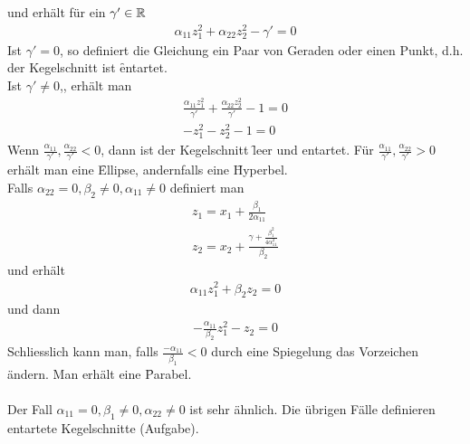 und erhält für ein $\gamma' \in \mathbb{R}$
\begin{align}
\alpha_{11} z_{1}^{2} + \alpha_{22} z_{2}^{2} - \gamma' = 0
\end{align}
Ist $\gamma' = 0$, so definiert die Gleichung ein Paar von Geraden oder einen Punkt, d.h. der Kegelschnitt ist \f{entartet}. \\
Ist $\gamma' \neq 0$,, erhält man
\begin{align}
\frac{\alpha_{11} z_{1}^{2}}{\gamma'} + \frac{\alpha_{22} z_{2}^{2}}{\gamma'} - 1 = 0 \\
-z_{1}^{2} - z_{2}^{2} -1 = 0
\end{align}
Wenn $\frac{\alpha_{11}}{\gamma'}, \frac{\alpha_{22}}{\gamma'} < 0$, dann ist der Kegelschnitt \f{leer} und entartet.
Für $\frac{\alpha_{11}}{\gamma'}, \frac{\alpha_{22}}{\gamma'} > 0$ erhält man eine \f{Ellipse}, andernfalls eine \f{Hyperbel}. \\
Falls $\alpha_{22} = 0, \beta_2 \neq 0, \alpha_{11} \neq 0$ definiert man
\begin{align}
z_1 = x_1 + \frac{\beta_1}{2 \alpha_{11}} \\
z_2 = x_2 + \frac{\gamma + \frac{\beta_{1}^{2}}{4 \alpha_{11}^{2}}}{\beta_{2}}
\end{align}
und erhält
\begin{align}
\alpha_{11} z_{1}^{2} + \beta_{2} z_{2} = 0
\end{align}
und dann
\begin{align}
- \frac{\alpha_{11}}{\beta_2} z_{1}^{2} - z_2 = 0
\end{align}
Schliesslich kann man, falls $\frac{-\alpha_{11}}{\beta_1} < 0$ durch eine Spiegelung das Vorzeichen ändern. Man erhält eine \f{Parabel}. \\\\
Der Fall $\alpha_{11} = 0, \beta_1 \neq 0, \alpha_{22} \neq 0$ ist sehr ähnlich. Die übrigen Fälle definieren entartete Kegelschnitte (Aufgabe).

